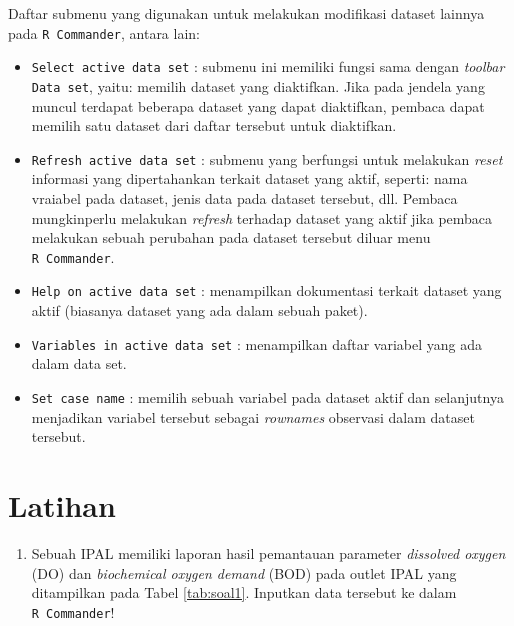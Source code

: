 \documentclass[12pt,]{krantz}
\providecommand{\tightlist}{%
  \setlength{\itemsep}{0pt}\setlength{\parskip}{0pt}}
\begin{document}
Daftar submenu yang digunakan untuk melakukan modifikasi dataset lainnya pada \texttt{R\ Commander}, antara lain:

\begin{itemize}
\tightlist
\item
  \texttt{Select\ active\ data\ set} : submenu ini memiliki fungsi sama dengan \emph{toolbar} \texttt{Data\ set}, yaitu: memilih dataset yang diaktifkan. Jika pada jendela yang muncul terdapat beberapa dataset yang dapat diaktifkan, pembaca dapat memilih satu dataset dari daftar tersebut untuk diaktifkan.
\item
  \texttt{Refresh\ active\ data\ set} : submenu yang berfungsi untuk melakukan \emph{reset} informasi yang dipertahankan terkait dataset yang aktif, seperti: nama vraiabel pada dataset, jenis data pada dataset tersebut, dll. Pembaca mungkinperlu melakukan \emph{refresh} terhadap dataset yang aktif jika pembaca melakukan sebuah perubahan pada dataset tersebut diluar menu \texttt{R\ Commander}.
\item
  \texttt{Help\ on\ active\ data\ set} : menampilkan dokumentasi terkait dataset yang aktif (biasanya dataset yang ada dalam sebuah paket).
\item
  \texttt{Variables\ in\ active\ data\ set} : menampilkan daftar variabel yang ada dalam data set.
\item
  \texttt{Set\ case\ name} : memilih sebuah variabel pada dataset aktif dan selanjutnya menjadikan variabel tersebut sebagai \emph{rownames} observasi dalam dataset tersebut.
\end{itemize}

\hypertarget{latihan}{%
\section{Latihan}\label{latihan}}

\begin{enumerate}
\def\labelenumi{\arabic{enumi}.}
\tightlist
\item
  Sebuah IPAL memiliki laporan hasil pemantauan parameter \emph{dissolved oxygen} (DO) dan \emph{biochemical oxygen demand} (BOD) pada outlet IPAL yang ditampilkan pada Tabel \ref{tab:soal1}. Inputkan data tersebut ke dalam \texttt{R\ Commander}!
\end{enumerate}
\end{document}
